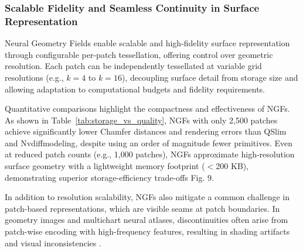\subsubsection{Scalable Fidelity and Seamless Continuity in Surface Representation}

Neural Geometry Fields enable scalable and high-fidelity surface representation through configurable per-patch tessellation, offering control over geometric resolution. 
Each patch can be independently tessellated at variable grid resolutions (e.g., $k=4$ to $k=16$), decoupling surface detail from storage size and allowing adaptation to computational budgets and fidelity requirements. 

Quantitative comparisons highlight the compactness and effectiveness of NGFs. 
As shown in Table~\ref{tab:storage_vs_quality}, NGFs with only 2,500 patches achieve significantly lower Chamfer distances and rendering errors than QSlim and Nvdiffmodeling, despite using an order of magnitude fewer primitives. 
Even at reduced patch counts (e.g., 1,000 patches), NGFs approximate high-resolution surface geometry with a lightweight memory footprint ($<$200 KB), demonstrating superior storage-efficiency trade-offs \cite{sivaram2024} Fig. 9. 

\begin{table}[h]
\caption{Storage vs. visual quality on the Ganesha model. Inspired by \cite{sivaram2024}, Table 2 and Fig. 7.}
\centering
{}
\label{tab:storage_vs_quality}
\end{table}

In addition to resolution scalability, NGFs also mitigate a common challenge in patch-based representations, which are visible seams at patch boundaries. 
In geometry images and multichart neural atlases, discontinuities often arise from patch-wise encoding with high-frequency features, resulting in shading artifacts and visual inconsistencies \cite{Gu2002}. 

